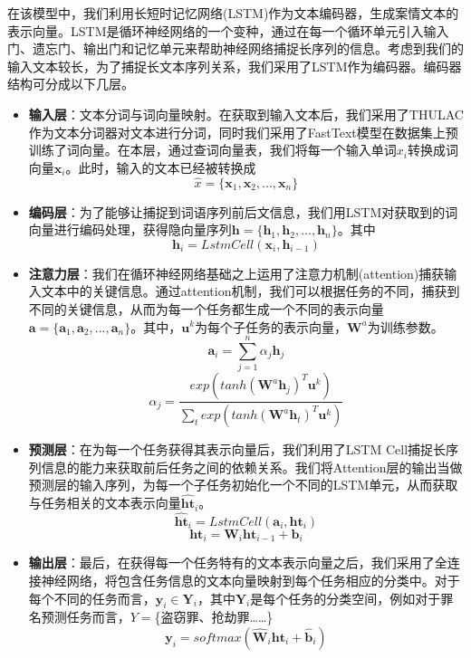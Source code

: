在该模型中，我们利用长短时记忆网络(LSTM)作为文本编码器，生成案情文本的表示向量。LSTM是循环神经网络的一个变种，通过在每一个循环单元引入输入门、遗忘门、输出门和记忆单元来帮助神经网络捕捉长序列的信息。考虑到我们的输入文本较长，为了捕捉长文本序列关系，我们采用了LSTM作为编码器。编码器结构可分成以下几层。
\begin{itemize}
	\item \textbf{输入层}：文本分词与词向量映射。在获取到输入文本后，我们采用了THULAC作为文本分词器对文本进行分词，同时我们采用了FastText模型在数据集上预训练了词向量。在本层，通过查词向量表，我们将每一个输入单词$x_{i}$转换成词向量$\mathbf{x}_{i}$。此时，输入的文本已经被转换成
	\begin{equation}
		\hat{x} = \{\mathbf{x}_{1}, \mathbf{x}_{2}, ..., \mathbf{x}_{n}\}
	\end{equation}
	\item \textbf{编码层}：为了能够让捕捉到词语序列前后文信息，我们用LSTM对获取到的词向量进行编码处理，获得隐向量序列$\mathbf{h} = \{\mathbf{h}_{1}, \mathbf{h}_{2}, ...,\mathbf{h}_{n}\}$。其中
		\begin{equation}
			\mathbf{h}_{i} = LstmCell(\mathbf{x}_{i}, \mathbf{h}_{i-1})
		\end{equation}
	\item \textbf{注意力层}：我们在循环神经网络基础之上运用了注意力机制(attention)捕获输入文本中的关键信息。通过attention机制，我们可以根据任务的不同，捕获到不同的关键信息，从而为每一个任务都生成一个不同的表示向量$\mathbf{a} = \{\mathbf{a}_{1}, \mathbf{a}_{2}, ..., \mathbf{a}_{n}\}$。其中，$\mathbf{u}^{k}$为每个子任务的表示向量，$\mathbf{W}^{a}$为训练参数。
		\begin{equation}
			\mathbf{a}_{i} = \sum_{j=1}^{n}\alpha_{j}\mathbf{h}_{j}
		\end{equation}
		\begin{equation}
			\alpha_{j} = \frac{exp(tanh(\mathbf{W}^{a}\mathbf{h}_{j})^{T}\mathbf{u}^{k})}{\sum_{t}exp(tanh(\mathbf{W}^{a}\mathbf{h}_{t})^{T}\mathbf{u}^{k})}
		\end{equation}
	\item \textbf{预测层}：在为每一个任务获得其表示向量后，我们利用了LSTM Cell捕捉长序列信息的能力来获取前后任务之间的依赖关系。我们将Attention层的输出当做预测层的输入序列，为每一个子任务初始化一个不同的LSTM单元，从而获取与任务相关的文本表示向量$\hat{\mathbf{ht}}_{i}$。
		\begin{equation}
			\hat{\mathbf{ht}}_{i} = LstmCell(\mathbf{a}_{i}, \mathbf{ht}_{i})
		\end{equation}
		\begin{equation}
			\mathbf{ht}_{i} = \mathbf{W}_{i}\mathbf{ht}_{i-1} + \mathbf{b}_{i}
		\end{equation}
	\item \textbf{输出层}：最后，在获得每一个任务特有的文本表示向量之后，我们采用了全连接神经网络，将包含任务信息的文本向量映射到每个任务相应的分类中。对于每个不同的任务而言，$\mathbf{y}_{i} \in \mathbf{Y}_{i}$，其中$\mathbf{Y}_{i}$是每个任务的分类空间，例如对于罪名预测任务而言，$Y =$\{盗窃罪、抢劫罪……\}
		\begin{equation}
			\mathbf{y}_{i} = softmax(\mathbf{\hat{W}}_{i}\mathbf{ht}_{i} + \mathbf{\hat{b}}_{i})
		\end{equation}
	

\end{itemize}
